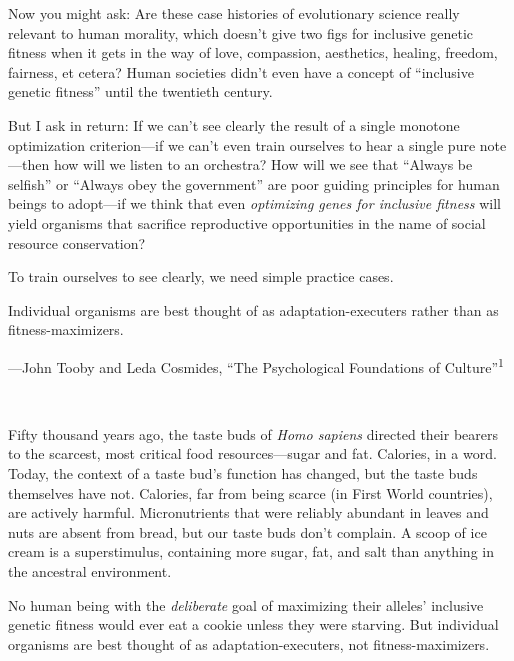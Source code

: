 {
 Now you might ask: Are these case histories of evolutionary
science really relevant to human morality, which
doesn't give two figs for inclusive genetic fitness
when it gets in the way of love, compassion, aesthetics, healing,
freedom, fairness, et cetera? Human societies didn't
even have a concept of ``inclusive genetic
fitness'' until the twentieth century.}

{
 But I ask in return: If we can't see clearly the
result of a single monotone optimization criterion---if we
can't even train ourselves to hear a single pure
note---then how will we listen to an orchestra? How will we see that
``Always be selfish'' or
``Always obey the government'' are
poor guiding principles for human beings to adopt---if we think that
even \textit{optimizing genes for inclusive fitness} will yield
organisms that sacrifice reproductive opportunities in the name of
social resource conservation?}

{
 To train ourselves to see clearly, we need simple practice cases.}

\myendsectiontext


{
 Individual organisms are best thought of as adaptation-executers
rather than as fitness-maximizers.}

{\raggedleft
 {}---John Tooby and Leda Cosmides,\newline
 ``The Psychological Foundations of
Culture''\textsuperscript{1}
\par}


\bigskip

{
 ~}

{
 Fifty thousand years ago, the taste buds of \textit{Homo sapiens}
directed their bearers to the scarcest, most critical food
resources---sugar and fat. Calories, in a word. Today, the context of a
taste bud's function has changed, but the taste buds
themselves have not. Calories, far from being scarce (in First World
countries), are actively harmful. Micronutrients that were reliably
abundant in leaves and nuts are absent from bread, but our taste buds
don't complain. A scoop of ice cream is a
superstimulus, containing more sugar, fat, and salt than anything in
the ancestral environment.}

{
 No human being with the \textit{deliberate} goal of maximizing
their alleles' inclusive genetic fitness would ever eat
a cookie unless they were starving. But individual organisms are best
thought of as adaptation-executers, not fitness-maximizers.}


